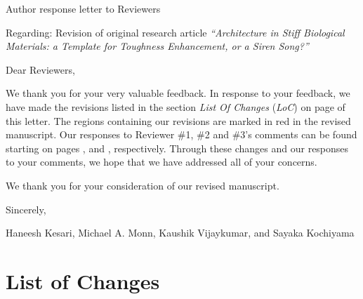 \documentclass[11pt,letterpaper]{report}
\newcommand{\loc}{\textit{LoC}}
\begin{document}
\thispagestyle{fancy}
\phantom{x}
\vspace{4em}
Author response letter to Reviewers

Regarding: Revision of original research article \textit{``Architecture in Stiff Biological Materials: a Template for Toughness Enhancement, or a Siren Song?''}

\vspace{4em}
Dear Reviewers,

We thank you for your very valuable feedback. In response to your feedback, we have made the revisions listed in the section \textit{List Of Changes} (\loc) on page \pageref{LoCpage} of this letter. The regions containing our revisions are marked in red in the revised manuscript. Our responses to Reviewer \#1, \#2 and \#3's comments can be found starting on pages \pageref{rev1}, \pageref{rev2} and \pageref{rev3}, respectively. Through these changes and our responses to your comments, we hope that we have addressed all of your concerns.

We thank you for your consideration of our revised manuscript.

\vspace{2em}
Sincerely,

Haneesh Kesari, Michael A. Monn, Kaushik Vijaykumar, and Sayaka Kochiyama


\clearpage
\pagestyle{plain}
\section*{List of Changes}
\label{LoCpage}
\end{document}
